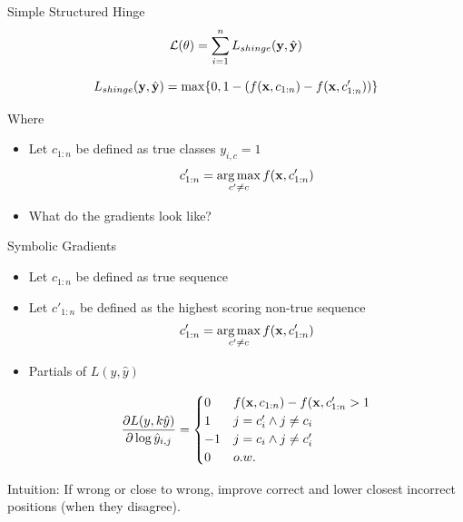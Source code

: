 \documentclass{beamer}
\begin{document}
\begin{frame}{Simple Structured Hinge}
  \[{\mathcal{L}(\theta)} = \sum_{i=1}^n L_{shinge}(\mathbf{y},\hat{\mathbf{y}}) \] 


  \[ L_{shinge}(\mathbf{y}, \hat{\mathbf{y}}) =  \max\{0, 1 - (f(\mathbf{x}, c_{1:n}) - f(\mathbf{x}, {c'_{1:n}})) \}  \]

  Where 
  \begin{itemize}
  \item   Let $c_{1:n}$ be defined as true classes $y_{i, c} = 1$  
    \[c'_{1:n} = \argmax_{c' \neq c } f(\boldx, c'_{1:n}) \] 
  \end{itemize}
  
  \begin{itemize}
  \item What do the gradients look like?
  \end{itemize}

\end{frame}


\begin{frame}{Symbolic Gradients}

  \begin{itemize}
  \item   Let $c_{1:n}$ be defined as true sequence
  \item   Let $c'_{1:n}$ be defined as the highest scoring non-true sequence 
    \[c'_{1:n} = \argmax_{c' \neq c} f(\boldx, c'_{1:n}) \]
  \item Partials of $L(y, \hat{y})$

  \[ \frac{\partial L(y,k \hat{y})}{\partial \log \hat{y}_{i,j}} =
      \begin{cases}
         0 & f(\mathbf{x}, c_{1:n}) - f(\mathbf{x}, {c'_{1:n}} > 1  \\
         1 & j = c'_i \land j \neq c_i \\
         -1 & j = c_i \land j \neq c'_i \\
         0 & o.w. \\ 
      \end{cases}
  \]
  \end{itemize}
  Intuition: If wrong or close to wrong, improve correct and lower closest incorrect positions (when they disagree).
\end{frame}
\end{document}
